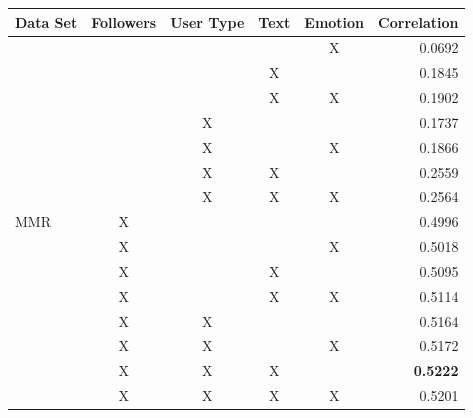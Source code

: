 \begin{longtable}{l|c|c|c|c|r}
\pagebreak
Data Set                   & Followers & User Type & Text & Emotion & \multicolumn{1}{l}{Correlation} \\ \hline
\multirow{15}{*}{MMR}      &           &           &      & X       & 0.0692                           \\ \cline{2-6} 
                           &           &           & X    &         & 0.1845                           \\ \cline{2-6} 
                           &           &           & X    & X       & 0.1902                           \\ \cline{2-6} 
                           &           & X         &      &         & 0.1737                           \\ \cline{2-6} 
                           &           & X         &      & X       & 0.1866                           \\ \cline{2-6} 
                           &           & X         & X    &         & 0.2559                           \\ \cline{2-6} 
                           &           & X         & X    & X       & 0.2564                           \\ \cline{2-6} 
                           & X         &           &      &         & 0.4996                           \\ \cline{2-6} 
                           & X         &           &      & X       & 0.5018                           \\ \cline{2-6} 
                           & X         &           & X    &         & 0.5095                           \\ \cline{2-6} 
                           & X         &           & X    & X       & 0.5114                           \\ \cline{2-6} 
                           & X         & X         &      &         & 0.5164                           \\ \cline{2-6} 
                           & X         & X         &      & X       & 0.5172                           \\ \cline{2-6} 
                           & X         & X         & X    &         & \textbf{0.5222}                           \\ \cline{2-6} 
                           & X         & X         & X    & X       & 0.5201                           \\ \hline

\end{longtable}
